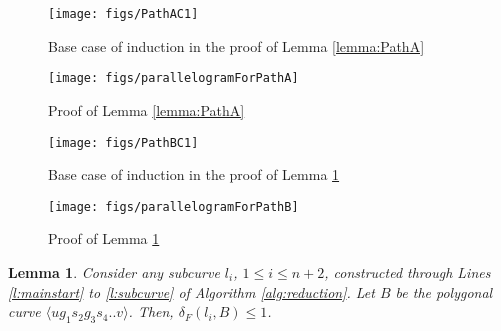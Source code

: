 \documentclass[12pt]{dalthesis}
\newtheorem{lemma}[theorem]{Lemma}
\newcommand{\distF}{\delta_F}
\newcommand{\gre}{{g}}
\newcommand{\sma}{{s}}
\newcommand{\cfev}{{l}}
\begin{document}
\begin{figure}[h]
	\centering
	\texttt{[image: figs/PathAC1]}
	\caption{Base case of induction in the proof of Lemma \ref{lemma:PathA}}
	\label{fig:PathAClause1}
\end{figure}






\begin{figure}
	\centering
	\texttt{[image: figs/parallelogramForPathA]}
	\caption{Proof of Lemma \ref{lemma:PathA}}
	\label{fig:PathA}
\end{figure}
	



\begin{figure}[h]
	\centering
	\texttt{[image: figs/PathBC1]}
	\caption{Base case of induction in the proof of Lemma \ref{lemma:PathB} }
	\label{fig:PathBBaseCase}
\end{figure}



\begin{figure}[h]

	\centering
	\texttt{[image: figs/parallelogramForPathB]}
	\caption{Proof of Lemma \ref{lemma:PathB}}
	\label{fig:PathB}
\end{figure}


\begin{lemma}\label{lemma:PathB}
Consider any subcurve $\cfev_i$, $1\le i \le n+2$,  
constructed through Lines \ref{l:mainstart} to \ref{l:subcurve} 
of Algorithm \ref{alg:reduction}. Let $B$ be the polygonal curve  $\langle u\gre_1\sma_2\gre_3\sma_4..v\rangle$. Then, $\distF(\cfev_i,B) \le 1$.
\end{lemma}
\end{document}
